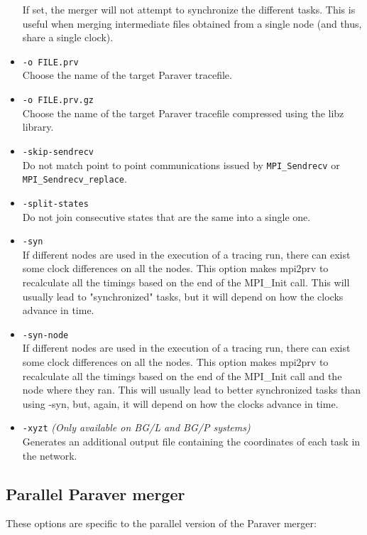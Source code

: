\begin{itemize}
 If set, the merger will not attempt to synchronize the different tasks. This is useful when merging intermediate files obtained from a single node (and thus, share a single clock).
 \item {\tt -o FILE.prv}\\
 Choose the name of the target Paraver tracefile.
 \item {\tt -o FILE.prv.gz}\\
 Choose the name of the target Paraver tracefile compressed using the libz library.
 \item {\tt -skip-sendrecv}\\
 Do not match point to point communications issued by {\tt MPI\_Sendrecv} or {\tt MPI\_Sendrecv\_replace}.
 \item {\tt -split-states}\\
 Do not join consecutive states that are the same into a single one.
 \item {\tt -syn}\\
 If different nodes are used in the execution of a tracing run, there can exist some clock differences on all the nodes. This option makes mpi2prv to recalculate all the timings based on the end of the MPI\_Init call. This will usually lead to "synchronized" tasks, but it will depend on how the clocks advance in time.
 \item {\tt -syn-node}\\
 If different nodes are used in the execution of a tracing run, there can exist some clock differences on all the nodes. This option makes mpi2prv to recalculate all the timings based on the end of the MPI\_Init call and the node where they ran. This will usually lead to better synchronized tasks than using -syn, but, again, it will depend on how the clocks advance in time.
 \item {\tt -xyzt} {\em (Only available on BG/L and BG/P systems)}\\
 Generates an additional output file containing the coordinates of each task in the network.
\end{itemize}

\subsection{Parallel Paraver merger}

These options are specific to the parallel version of the Paraver merger:

